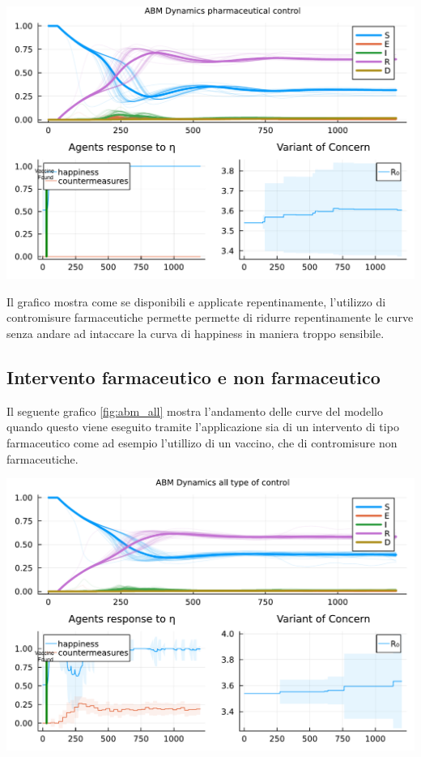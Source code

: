 \begin{minipage}{\linewidth}
	\centering
	\includegraphics[width=\textwidth]{img/SocialNetworkABM_VACCINE.pdf}
	\label{fig:abm_vaccine}
\end{minipage}

Il grafico mostra come se disponibili e applicate repentinamente, l'utilizzo di contromisure farmaceutiche permette 
permette di ridurre repentinamente le curve senza andare ad intaccare la curva di happiness in maniera troppo sensibile.

\subsection{Intervento farmaceutico e non farmaceutico}
Il seguente grafico \ref{fig:abm_all} mostra l'andamento delle curve del modello
quando questo viene eseguito tramite l'applicazione sia di un intervento di tipo farmaceutico 
come ad esempio l'utillizo di un vaccino, che di contromisure non farmaceutiche.

\begin{minipage}{\linewidth}
	\centering
	\includegraphics[width=\textwidth]{img/SocialNetworkABM_ALL.pdf}
	\label{fig:abm_all}
\end{minipage}

